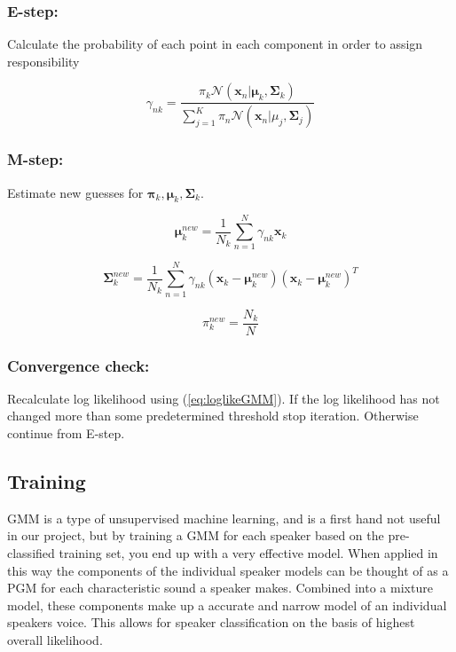 \subsubsection*{E-step:}
Calculate the probability of each point in each component in order to assign responsibility

\begin{equation}
\label{eq:GMM_gamma} 
\gamma_{nk} = 
\frac
{\pi_{k}\mathcal{N}(\mathbf{x}_{n}|\mathbf{\mu}_{k},\mathbf{\Sigma}_{k})}
{\sum_{j=1}^{K} \pi_{n}\mathcal{N}(\mathbf{x}_{n}|\mu_{j},\mathbf{\Sigma}_{j})}
\end{equation}

\subsubsection*{M-step:}
Estimate new guesses for $ \mathbf{\pi}_{k}, \bm{\mu}_{k}, \bm{\Sigma}_{k} $.

\begin{equation}
\label{eq:GMM_mu} 
\bm{\mu}_{k}^{new} = 
\frac{1}{N_{k}}
\sum_{n=1}^{N} 
\gamma_{nk}
\mathbf{x}_{k}
\end{equation}

\begin{equation}
\label{eq:GMM_Sigma} 
\bm{\Sigma}_{k}^{new} = 
\frac{1}{N_{k}}
\sum_{n=1}^{N} 
\gamma_{nk}
(\mathbf{x}_{k} - \bm{\mu}_{k}^{new})
(\mathbf{x}_{k} - \bm{\mu}_{k}^{new})^{T}
\end{equation}

\begin{equation}
\pi_{k}^{new} =
\frac
{N_{k}}
{N}
\end{equation}

\subsubsection*{Convergence check:}

Recalculate log likelihood using (\ref{eq:loglikeGMM}).
If the log likelihood has not changed more than some predetermined threshold stop iteration.
Otherwise continue from E-step.

\subsection*{Training}
GMM is a type of unsupervised machine learning, and is a first hand not useful in our project, but by training a GMM for each speaker based on the pre-classified training set, you end up with a very effective model.
When applied in this way the components of the individual speaker models can be thought of as a PGM for each characteristic sound a speaker makes.
Combined into a mixture model, these components make up a accurate and narrow model of an individual speakers voice.
This allows for speaker classification on the basis of highest overall likelihood.

